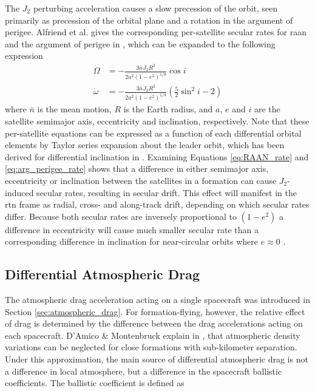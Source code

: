 The $J_2$ perturbing acceleration causes a slow precession of the orbit, seen primarily as precession of the orbital plane and a rotation in the argument of perigee. Alfriend et al. gives the corresponding per-satellite secular rates for \gls{raan} and the argument of perigee in \cite{alfriend2010}, which can be expanded to the following expression \cite{hajovsky2007}
\begin{align}
\label{eq:RAAN_rate}
\dot{\Omega} &=
-\frac{3 \bar{n} J_2 R^2}{2 a^2 \left(1 - e^2\right)^{1/8}}\cos i \\[1em]
\dot{\omega} &=
-\frac{3 \bar{n} J_2 R^2}{2 a^2 \left(1 - e^2\right)^{1/8}}
\left(\frac{5}{2}\sin^2 i - 2\right)
\label{eq:arg_perigee_rate}
\end{align}
where $\bar{n}$ is the mean motion, $R$ is the Earth radius, and $a$, $e$ and $i$ are the satellite semimajor axis, eccentricity and inclination, respectively. Note that these per-satellite equations can be expressed as a function of each differential orbital elements by Taylor series expansion about the leader orbit, which has been derived for differential inclination in \cite{alfriend2010}. Examining Equations \ref{eq:RAAN_rate} and \ref{eq:arg_perigee_rate} shows that a difference in either semimajor axis, eccentricity or inclination between the satellites in a formation can cause $J_2$-induced secular rates, resulting in secular drift. This effect will manifest in the \gls{rtn} frame as radial, cross- and along-track drift, depending on which secular rates differ. Because both secular rates are inversely proportional to $(1-e^2)$ a difference in eccentricity will cause much smaller secular rate than a corresponding difference in inclination for near-circular orbits where $e \approx 0$ \cite{alfriend2010}.



\subsection{Differential Atmospheric Drag}
\label{sec:diff_drag}
The atmospheric drag acceleration acting on a single spacecraft was introduced in Section \ref{sec:atmospheric_drag}. For formation-flying, however, the relative effect of drag is determined by the difference between the drag accelerations acting on each spacecraft. D'Amico \& Montenbruck explain in \cite{damico2006proximity}, that atmospheric density variations can be neglected for close formations with sub-kilometer separation. Under this approximation, the main source of differential atmospheric drag is not a difference in local atmosphere, but a difference in the spacecraft ballistic coefficients. The ballistic coefficient is defined as 

